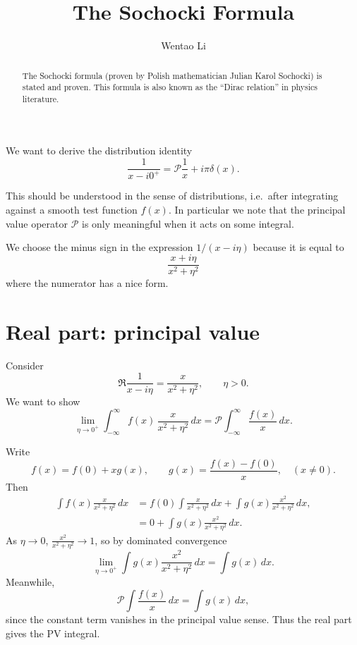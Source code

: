 \documentclass{article}
\author{Wentao Li}
\theoremstyle{definition}
\theoremstyle{plain}
\numberwithin{equation}{section}
\begin{document}
    
\title{The Sochocki Formula}

\maketitle

\begin{abstract}
    The Sochocki formula (proven by 
    Polish mathematician Julian Karol Sochocki) 
    is stated and proven. 
    This formula is also known as the 
    ``Dirac relation'' in physics literature.
\end{abstract}

We want to derive the distribution identity
\begin{equation}
\frac{1}{x-i0^+} = \mathcal{P}\frac{1}{x} + i\pi \delta(x).
\end{equation}

This should be understood in the sense of distributions, i.e.\ after integrating against a smooth test function $f(x)$.
In particular we note that the principal value operator $\mathcal{P}$ is only meaningful when it acts on some integral.

We choose the minus sign in the expression $1/(x-i\eta)$ because it is equal to
 \[
\frac{x+i\eta}{x^{2}+\eta^{2}}
 \]
where the numerator has a nice form.
\section{Real part: principal value}

Consider
\begin{equation}
\Re \frac{1}{x-i\eta} = \frac{x}{x^{2}+\eta^{2}}, \qquad \eta > 0.
\end{equation}
We want to show
\begin{equation}
\lim_{\eta\to0^+}\int_{-\infty}^{\infty} f(x)\,\frac{x}{x^2+\eta^2}\,dx
= \mathcal{P}\int_{-\infty}^{\infty}\frac{f(x)}{x}\,dx.
\end{equation}

Write
\begin{equation}
f(x)=f(0)+x g(x), \qquad g(x)=\frac{f(x)-f(0)}{x}, \quad (x\neq 0).
\end{equation}
Then
\begin{align}
\int f(x)\frac{x}{x^2+\eta^2}\,dx
&= f(0)\int \frac{x}{x^2+\eta^2}\,dx + \int g(x)\frac{x^2}{x^2+\eta^2}\,dx, \\
&= 0 + \int g(x)\frac{x^2}{x^2+\eta^2}\,dx.
\end{align}
As $\eta \to 0$, $\frac{x^2}{x^2+\eta^2} \to 1$, so by dominated convergence
\begin{equation}
\lim_{\eta\to0^+}\int g(x)\frac{x^2}{x^2+\eta^2}\,dx = \int g(x)\,dx.
\end{equation}
Meanwhile,
\begin{equation}
\mathcal{P}\int \frac{f(x)}{x}\,dx = \int g(x)\,dx,
\end{equation}
since the constant term vanishes in the principal value sense. Thus the real part gives the PV integral.
\end{document}
